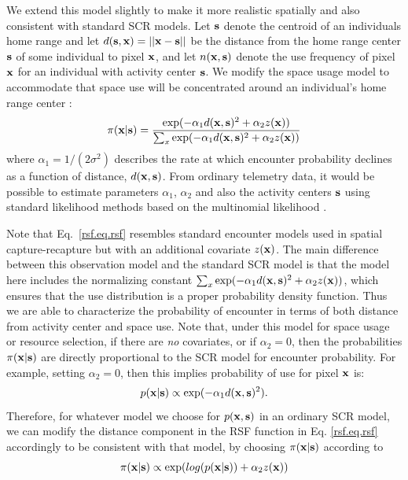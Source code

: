 \documentclass[12pt]{article}
\begin{document}
We extend this model slightly to make it more realistic spatially and
also consistent with standard SCR models. Let
${\bf s}$ denote the centroid of an individuals home range and let
$d({\bf s},{\bf x}) = ||{\bf x} - {\bf s}||$ be the distance from the home
range center ${\bf s}$ of some individual to pixel ${\bf x}$, and let
$n({\bf x},{\bf s})$ denote the use frequency of pixel ${\bf x}$ for an individual with
activity center ${\bf s}$.
We modify the space usage model to accommodate that space
use will be concentrated around an individual's home range center \citep{johnson_etal:2008,forester_etal:2009}:
\begin{equation}
 \pi({\bf x}|{\bf s})  = \frac{ \exp( -\alpha_{1} d({\bf x},{\bf s})^{2} +\alpha_{2} z({\bf x}) )}
{ \sum_{x} \exp(-\alpha_{1} d({\bf x},{\bf s})^{2} +\alpha_{2} z({\bf x}))}
\label{rsf.eq.rsf}
\end{equation}
where $\alpha_1=1/(2\sigma^2)$ describes the rate at which encounter
probability declines as a function of distance, $d({\bf x},{\bf
  s})$. From ordinary telemetry data, it would be possible to estimate
parameters $\alpha_{1}$, $\alpha_{2}$ and also the activity centers
${\bf s}$ using standard likelihood methods based on the multinomial
likelihood \citep{johnson_etal:2008}.

Note that Eq.~\ref{rsf.eq.rsf} resembles standard encounter models
used in spatial capture-recapture but with an additional covariate
$z({\bf x})$.  The main difference between this observation model and
the standard SCR model is that the model here includes the normalizing
constant $\sum_{x} \exp(-\alpha_{1} d({\bf x},{\bf s})^{2} +\alpha_{2}
z({\bf x}))$, which ensures that the use distribution is a proper
probability density function. Thus we are able to characterize the
probability of encounter in terms of both distance from activity
center and space use.
Note that, under this model for space usage or resource selection, if
there are {\it no} covariates, or if $\alpha_{2} = 0$, then the
probabilities $\pi({\bf x}|{\bf s})$ are directly proportional to the
SCR model for encounter probability.  For example, setting $\alpha_{2}
= 0$, then this implies probability of use for pixel ${\bf x}$ is:
\[
p({\bf x}|{\bf s}) \propto  \exp( -\alpha_{1} d({\bf x},{\bf s})^{2}).
\]
Therefore,
for whatever model we choose for
$p({\bf x},{\bf s})$ in an ordinary SCR model, we can modify the distance
component in the RSF function in Eq. \ref{rsf.eq.rsf} accordingly to
be consistent with that model, by choosing $\pi({\bf x}|{\bf s})$
according to
\[
\pi({\bf x}|{\bf s}) \propto \exp( log(p({\bf x}|{\bf s})) + \alpha_{2} z({\bf x}))
\]
\end{document}
